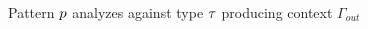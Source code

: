 \begin{figure}[htbp]
  \raggedright
   Pattern $\PMV$ analyzes against type $\TMV$ producing context $\Gamma_{out}$
  \begin{mathpar}
   
   

  \end{mathpar}
  \label{fig:calculus-pattern-analysis}
\end{figure}


